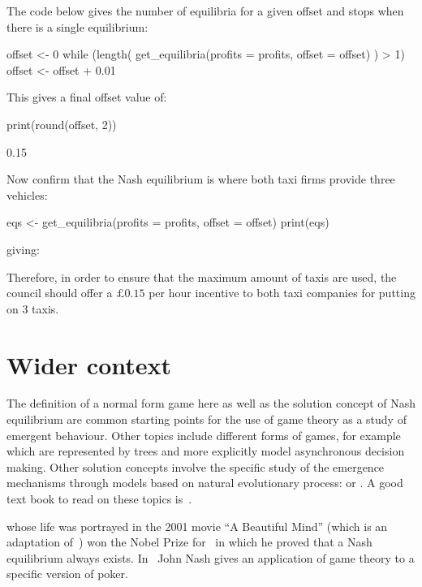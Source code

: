 The code below gives the number of equilibria for a given offset and stops when there is a
single equilibrium:

\begin{Rin}
offset <- 0
while (length(
  get_equilibria(profits = profits, offset = offset)
  ) > 1){
  offset <- offset + 0.01
}
\end{Rin}

This gives a final offset value of:

\begin{Rin}
print(round(offset, 2))
\end{Rin}

\begin{Rout}
[1] 0.15
\end{Rout}

Now confirm that the Nash equilibrium is where both taxi firms provide
three vehicles:

\begin{Rin}
eqs <- get_equilibria(profits = profits, offset = offset)
print(eqs)
\end{Rin}

giving:


Therefore, in order to ensure that the maximum amount of taxis are used, the
council should offer a \(\pounds 0.15\) per hour incentive to both taxi
companies for putting on 3 taxis.

\section{Wider context}\label{sec:game_theory_wider_context}

The definition of a normal form game here as well as the solution concept of
Nash equilibrium are common starting points for the use of game theory as a
study of emergent behaviour. Other topics include different forms of games, for
example  which are represented by trees and more explicitly model
asynchronous decision making. Other solution concepts involve the specific study
of the emergence mechanisms through models based on natural evolutionary
process:  or . A good text book to read on
these topics is~\cite{maschler2013game}.

 whose life was portrayed in the 2001 movie ``A Beautiful Mind'' (which
is an adaptation of~\cite{nasar2011beautiful}) won the Nobel Prize
for~\cite{nash1950equilibrium} in which he proved that a Nash equilibrium
always exists. In~\cite{nash1951non} John Nash gives an
application of game theory to a specific version of poker.

